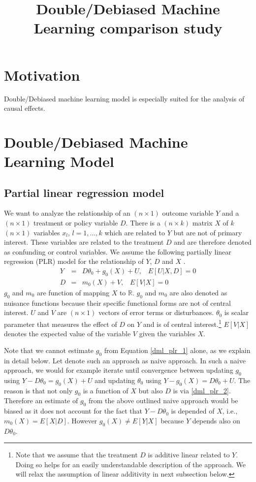 \documentclass[10pt]{article}
\title{Double/Debiased Machine Learning comparison study}
\begin{document}
\maketitle
{}
\section{Motivation}
Double/Debiased machine learning model is especially suited for the analysis of causal effects.

\section{Double/Debiased Machine Learning Model}
\subsection{Partial linear regression model}
We want to analyze the relationship of an $(n \times 1 )$ outcome variable $Y$ and a $(n \times 1 )$ treatment or policy variable $D$. 
There is a $(n \times k )$ matrix $X$ of $k$ $(n \times 1 )$ variables $x_l$, $l=1,...,k$ which are related to $Y$ but are not of primary interest.
These variables are related to the treatment $D$ and are therefore denoted as confunding or control variables.
We assume the following partially linear regression (PLR) model for the relationship of $Y$, $D$ and $X$ \cite{Cher2018}.
\begin{eqnarray}\label{dml_plr_1}
Y &=& D \theta_0 + g_0(X) + U, \;\;\; E[U|X,D] =0  	\\ \label{dml_plr_2}
D &=&  m_0(X) + V, \;\;\; E[V|X] =0  	
\end{eqnarray}
$g_0$ and $m_0$ are function of mapping $X$ to $\mathbb{R}$. 
$g_0$ and $m_0$ are also denoted as nuisance functions because their specific functional forms are not of central interest.
$U$ and $V$ are $(n \times 1 )$ vectors of error terms or disturbances. 
$\theta_0$ is scalar parameter that measures the effect of $D$ on $Y$ and is of central interest.\footnote{
Note that we assume that the treatment $D$ is additive linear related to $Y$. 
Doing so helps for an easily understandable description of the approach.
We will relax the assumption of linear additivity in next subsection below.}
$ E[V|X]$ denotes the expected value of the variable $V$ given the variables $X$.
	
Note that we cannot estimate $g_0$ from Equation \eqref{dml_plr_1} alone, as we explain in detail below. 
Let denote such an approach as naive approach.
In such a naive approach, we would for example iterate until convergence between updating $g_0$ using $Y - D \theta_0 = g_0(X) + U$ and updating $\theta_0$ using $Y - g_0(X) = D \theta_0 + U$. 
The reason is that not only $g_0$ is a function of $X$ but also $D$ is via \eqref{dml_plr_2}. 
Therefore an estimate of $g_0$ from the above outlined naive approach would be biased as it does not account for the fact that $Y - D \theta_0$ is depended of $X$, i.e., $ m_0(X) = E[X|D] $.
However $ g_0(X) \ne E[Y|X] $ because $Y$ depends also on $D \theta_0$.
\end{document}
